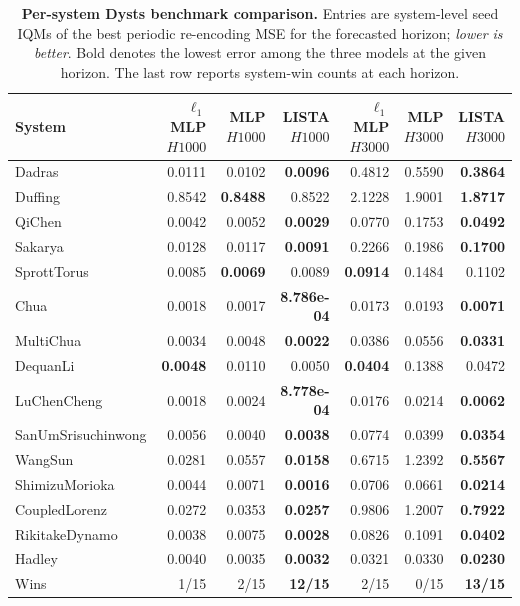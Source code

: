 \begin{table}[ht]
\centering
\scriptsize
\setlength{\tabcolsep}{4pt}
\begin{tabular}{p{}rrrrrr}
\toprule
System & $\ell_1$ MLP $H1000$ & MLP $H1000$ & LISTA $H1000$ & $\ell_1$ MLP $H3000$ & MLP $H3000$ & LISTA $H3000$ \\
\midrule
Dadras & 0.0111 & 0.0102 & \textbf{0.0096} & 0.4812 & 0.5590 & \textbf{0.3864} \\
Duffing & 0.8542 & \textbf{0.8488} & 0.8522 & 2.1228 & 1.9001 & \textbf{1.8717} \\
QiChen & 0.0042 & 0.0052 & \textbf{0.0029} & 0.0770 & 0.1753 & \textbf{0.0492} \\
Sakarya & 0.0128 & 0.0117 & \textbf{0.0091} & 0.2266 & 0.1986 & \textbf{0.1700} \\
SprottTorus & 0.0085 & \textbf{0.0069} & 0.0089 & \textbf{0.0914} & 0.1484 & 0.1102 \\
Chua & 0.0018 & 0.0017 & \textbf{8.786e-04} & 0.0173 & 0.0193 & \textbf{0.0071} \\
MultiChua & 0.0034 & 0.0048 & \textbf{0.0022} & 0.0386 & 0.0556 & \textbf{0.0331} \\
DequanLi & \textbf{0.0048} & 0.0110 & 0.0050 & \textbf{0.0404} & 0.1388 & 0.0472 \\
LuChenCheng & 0.0018 & 0.0024 & \textbf{8.778e-04} & 0.0176 & 0.0214 & \textbf{0.0062} \\
SanUmSrisuchinwong & 0.0056 & 0.0040 & \textbf{0.0038} & 0.0774 & 0.0399 & \textbf{0.0354} \\
WangSun & 0.0281 & 0.0557 & \textbf{0.0158} & 0.6715 & 1.2392 & \textbf{0.5567} \\
ShimizuMorioka & 0.0044 & 0.0071 & \textbf{0.0016} & 0.0706 & 0.0661 & \textbf{0.0214} \\
CoupledLorenz & 0.0272 & 0.0353 & \textbf{0.0257} & 0.9806 & 1.2007 & \textbf{0.7922} \\
RikitakeDynamo & 0.0038 & 0.0075 & \textbf{0.0028} & 0.0826 & 0.1091 & \textbf{0.0402} \\
Hadley & 0.0040 & 0.0035 & \textbf{0.0032} & 0.0321 & 0.0330 & \textbf{0.0230} \\
\midrule
Wins & 1/15 & 2/15 & \textbf{12/15} & 2/15 & 0/15 & \textbf{13/15} \\
\bottomrule
\end{tabular}
\caption{\textbf{Per-system Dysts benchmark comparison.} Entries are system-level seed IQMs of the best periodic re-encoding MSE for the forecasted horizon; \textit{lower is better}. Bold denotes the lowest error among the three models at the given horizon. The last row reports system-win counts at each horizon.}
\label{tab:dysts-per-system}
\end{table}

